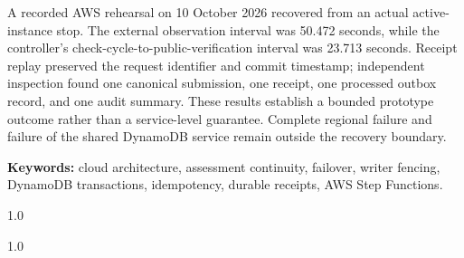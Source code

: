 \documentclass[12pt,a4paper,oneside]{report}
\begin{document}
A recorded AWS rehearsal on 10 October 2026 recovered from an actual active-instance stop. The external observation interval was 50.472 seconds, while the controller's check-cycle-to-public-verification interval was 23.713 seconds. Receipt replay preserved the request identifier and commit timestamp; independent inspection found one canonical submission, one receipt, one processed outbox record, and one audit summary. These results establish a bounded prototype outcome rather than a service-level guarantee. Complete regional failure and failure of the shared DynamoDB service remain outside the recovery boundary.

\noindent\textbf{Keywords:} cloud architecture, assessment continuity, failover, writer fencing, DynamoDB transactions, idempotency, durable receipts, AWS Step Functions.
{\small\setlength{\parskip}{0pt}\begin{spacing}{1.0}\tableofcontents\end{spacing}}\clearpage
{\small\setlength{\parskip}{0pt}\begin{spacing}{1.0}\listoffigures\listoftables\end{spacing}}\clearpage
\end{document}
